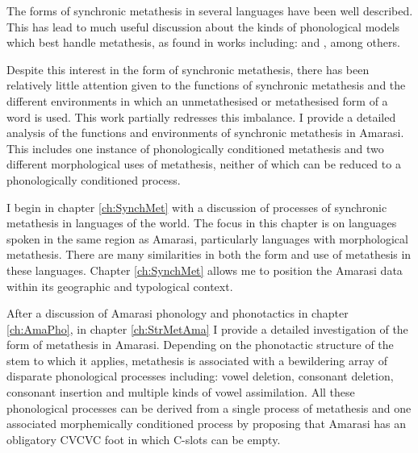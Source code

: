 \begin{exe}
	\label{ex:el. 22/02/16 p.19}
\end{exe}

The forms of synchronic metathesis in several languages have been well described.
This has lead to much useful discussion about the kinds
of phonological models which best handle metathesis,
as found in works including:
\cite{be87,huen95,hu98,huse04,hu04} and \cite{he04}, among others.

Despite this interest in the form of synchronic metathesis,
there has been relatively little attention given to
the functions of synchronic metathesis
and the different environments in which an unmetathesised
or metathesised form of a word is used.
This work partially redresses this imbalance.
I provide a detailed analysis of the functions and
environments of synchronic metathesis in Amarasi.
This includes one instance of phonologically conditioned metathesis
and two different morphological uses of metathesis,
neither of which can be reduced to a phonologically conditioned process.

I begin in chapter \ref{ch:SynchMet} with a discussion
of processes of synchronic metathesis in languages of the world.
The focus in this chapter is on languages spoken in the same region
as Amarasi, particularly languages with morphological metathesis.
There are many similarities in both the form and use of metathesis in these languages.
Chapter \ref{ch:SynchMet} allows me to position the Amarasi
data within its geographic and typological context.

After a discussion of Amarasi phonology and phonotactics
in chapter \ref{ch:AmaPho}, in chapter \ref{ch:StrMetAma}
I provide a detailed investigation of the form of metathesis in Amarasi.
Depending on the phonotactic structure of the stem to which it applies,
metathesis is associated with a bewildering
array of disparate phonological processes including:
vowel deletion, consonant deletion, consonant insertion
and multiple kinds of vowel assimilation.
All these phonological processes
can be derived from a single process of metathesis and
one associated morphemically conditioned process
by proposing that Amarasi has an obligatory
CVCVC foot in which C-slots can be empty.

